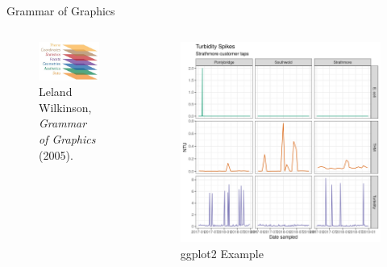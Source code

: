 \documentclass[
  ignorenonframetext,
]{beamer}
\begin{document}
\begin{frame}{Grammar of Graphics}
\protect\hypertarget{grammar-of-graphics}{}
\begin{columns}[T]
\begin{column}{0.48\textwidth}
\begin{figure}
\centering
\includegraphics{../manuscript/resources/06_visualisation/grammar_of_graphics.jpg}
\caption{Leland Wilkinson, \emph{Grammar of Graphics} (2005).}
\end{figure}
\end{column}

\begin{column}{0.48\textwidth}
\begin{figure}
\centering
\includegraphics{images/ggplot.png}
\caption{ggplot2 Example}
\end{figure}
\end{column}
\end{columns}
\end{frame}
\end{document}
